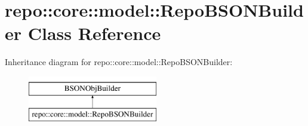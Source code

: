\hypertarget{classrepo_1_1core_1_1model_1_1_repo_b_s_o_n_builder}{}\section{repo\+:\+:core\+:\+:model\+:\+:Repo\+B\+S\+O\+N\+Builder Class Reference}
\label{classrepo_1_1core_1_1model_1_1_repo_b_s_o_n_builder}
Inheritance diagram for repo\+:\+:core\+:\+:model\+:\+:Repo\+B\+S\+O\+N\+Builder\+:\begin{figure}[H]
\begin{center}
\leavevmode
\includegraphics[height=2.000000cm]{classrepo_1_1core_1_1model_1_1_repo_b_s_o_n_builder}
\end{center}
\end{figure}
